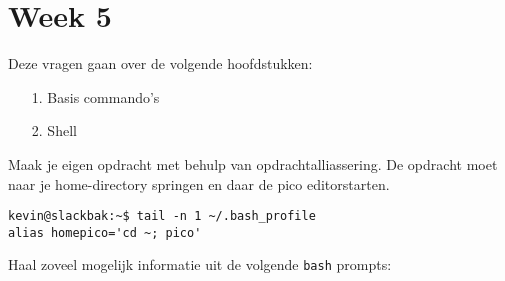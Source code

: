 %
%
%
%

\section{Week 5}
Deze vragen gaan over de volgende hoofdstukken:
\begin{itemize}
\item[1.] Basis commando's
\item[2.] Shell
\end{itemize}

\question[5] Maak je eigen opdracht met behulp van opdrachtalliassering. De opdracht moet naar je home-directory springen en daar de pico editorstarten.
\begin{solution}
\begin{lstlisting}
kevin@slackbak:~$ tail -n 1 ~/.bash_profile
alias homepico='cd ~; pico'
\end{lstlisting}%
\end{solution}

\question[0] Haal zoveel mogelijk informatie uit de volgende \texttt{bash} prompts:

